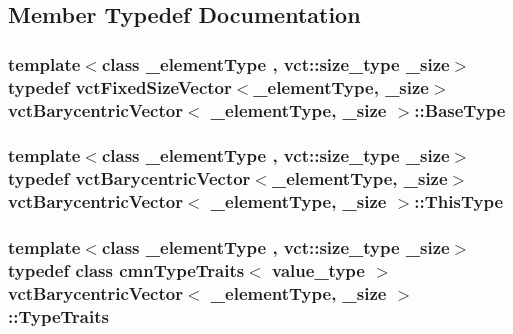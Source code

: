 \subsection{Member Typedef Documentation}
\hypertarget{classvct_barycentric_vector_aae25bb56b435677441a223ea76745bfd}{
\subsubsection[{Base\-Type}]{\setlength{\rightskip}{0pt plus 5cm}template$<$class \-\_\-element\-Type , vct\-::size\-\_\-type \-\_\-size$>$ typedef {\bf vct\-Fixed\-Size\-Vector}$<$\-\_\-element\-Type, \-\_\-size$>$ {\bf vct\-Barycentric\-Vector}$<$ \-\_\-element\-Type, \-\_\-size $>$\-::{\bf Base\-Type}}}\label{classvct_barycentric_vector_aae25bb56b435677441a223ea76745bfd}
\hypertarget{classvct_barycentric_vector_af89123d5c607a28e2328d5d370dffb33}{
\subsubsection[{This\-Type}]{\setlength{\rightskip}{0pt plus 5cm}template$<$class \-\_\-element\-Type , vct\-::size\-\_\-type \-\_\-size$>$ typedef {\bf vct\-Barycentric\-Vector}$<$\-\_\-element\-Type, \-\_\-size$>$ {\bf vct\-Barycentric\-Vector}$<$ \-\_\-element\-Type, \-\_\-size $>$\-::{\bf This\-Type}}}\label{classvct_barycentric_vector_af89123d5c607a28e2328d5d370dffb33}
\hypertarget{classvct_barycentric_vector_a7bbb060d2097b44bfa334eb75ebb6493}{
\subsubsection[{Type\-Traits}]{\setlength{\rightskip}{0pt plus 5cm}template$<$class \-\_\-element\-Type , vct\-::size\-\_\-type \-\_\-size$>$ typedef class {\bf cmn\-Type\-Traits}$<$ value\-\_\-type $>$ {\bf vct\-Barycentric\-Vector}$<$ \-\_\-element\-Type, \-\_\-size $>$\-::{\bf Type\-Traits}}}\label{classvct_barycentric_vector_a7bbb060d2097b44bfa334eb75ebb6493}


